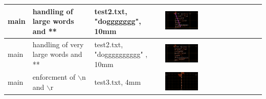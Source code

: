 \begin{longtable}{|>{\raggedright\arraybackslash}m{}|>{\raggedright\arraybackslash}m{}|>{\raggedright\arraybackslash}m{}|>{\raggedright\arraybackslash}m{}|}
        main & handling of large words and ** & test2.txt, "doggggggg", 10mm & \includegraphics[width=0.35\textwidth]{src/Screenshot 2024-12-11 at 21.42.49.png}\\ \hline
        main & handling of very large words and ** & test2.txt, "dogggggggggg" , 10mm &  \includegraphics[width=0.35\textwidth]{src/Screenshot 2024-12-11 at 21.43.48.png} \\ \hline
        main & enforcment of $\backslash$n and $\backslash$r & test3.txt, 4mm &  \includegraphics[width=0.35\textwidth]{src/Screenshot 2024-12-11 at 21.49.41.png} \\ \hline
        \end{longtable}

      